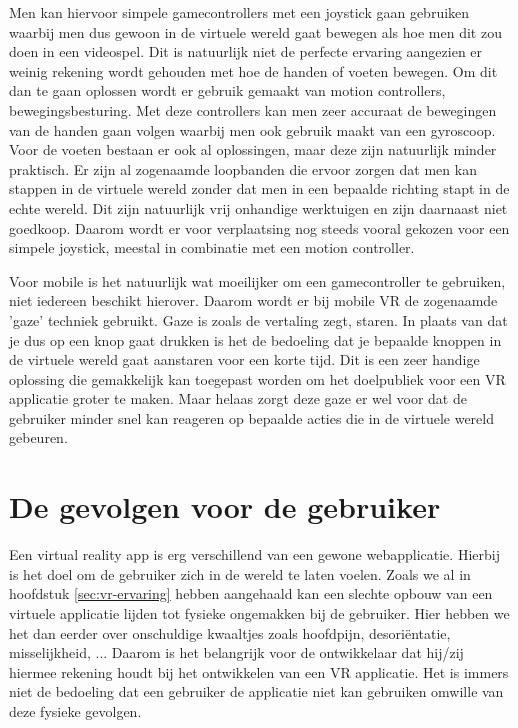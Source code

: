 Men kan hiervoor simpele gamecontrollers met een joystick gaan gebruiken waarbij men dus gewoon in de virtuele wereld gaat bewegen als hoe men dit zou doen in een videospel. Dit is natuurlijk niet de perfecte ervaring aangezien er weinig rekening wordt gehouden met hoe de handen of voeten bewegen. Om dit dan te gaan oplossen wordt er gebruik gemaakt van motion controllers, bewegingsbesturing. Met deze controllers kan men zeer accuraat de bewegingen van de handen gaan volgen waarbij men ook gebruik maakt van een gyroscoop. Voor de voeten bestaan er ook al oplossingen, maar deze zijn natuurlijk minder praktisch. Er zijn al zogenaamde loopbanden die ervoor zorgen dat men kan stappen in de virtuele wereld zonder dat men in een bepaalde richting stapt in de echte wereld. Dit zijn natuurlijk vrij onhandige werktuigen en zijn daarnaast niet goedkoop. Daarom wordt er voor verplaatsing nog steeds vooral gekozen voor een simpele joystick, meestal in combinatie met een motion controller.

Voor mobile is het natuurlijk wat moeilijker om een gamecontroller te gebruiken, niet iedereen beschikt hierover. Daarom wordt er bij mobile VR de zogenaamde 'gaze' techniek gebruikt. Gaze is zoals de vertaling zegt, staren. In plaats van dat je dus op een knop gaat drukken is het de bedoeling dat je bepaalde knoppen in de virtuele wereld gaat aanstaren voor een korte tijd. Dit is een zeer handige oplossing die gemakkelijk kan toegepast worden om het doelpubliek voor een VR applicatie groter te maken. Maar helaas zorgt deze gaze er wel voor dat de gebruiker minder snel kan reageren op bepaalde acties die in de virtuele wereld gebeuren.

\section{De gevolgen voor de gebruiker}
\label{sec:gevolgen-vr}
Een virtual reality app is erg verschillend van een gewone webapplicatie. Hierbij is het doel om de gebruiker zich in de wereld te laten voelen. Zoals we al in hoofdstuk \ref{sec:vr-ervaring} hebben aangehaald kan een slechte opbouw van een virtuele applicatie lijden tot fysieke ongemakken bij de gebruiker. Hier hebben we het dan eerder over onschuldige kwaaltjes zoals hoofdpijn, desoriëntatie, misselijkheid, ... Daarom is het belangrijk voor de ontwikkelaar dat hij/zij hiermee rekening houdt bij het ontwikkelen van een VR applicatie. Het is immers niet de bedoeling dat een gebruiker de applicatie niet kan gebruiken omwille van deze fysieke gevolgen.

